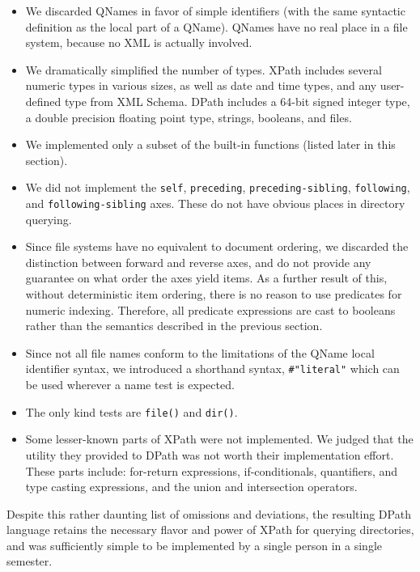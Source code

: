\documentclass{scrartcl}
\begin{document}
\begin{itemize}
\item We discarded QNames in favor of simple identifiers (with the same
  syntactic definition as the local part of a QName). QNames have no real place
  in a file system, because no XML is actually involved.
\item We dramatically simplified the number of types. XPath includes several
  numeric types in various sizes, as well as date and time types, and any
  user-defined type from XML Schema. DPath includes a 64-bit signed integer
  type, a double precision floating point type, strings, booleans, and files.
\item We implemented only a subset of the built-in functions (listed later in
  this section).
\item We did not implement the \texttt{self}, \texttt{preceding},
  \texttt{preceding-sibling}, \texttt{following}, and \texttt{following-sibling}
  axes. These do not have obvious places in directory querying.
\item Since file systems have no equivalent to document ordering, we discarded
  the distinction between forward and reverse axes, and do not provide any
  guarantee on what order the axes yield items. As a further result of this,
  without deterministic item ordering, there is no reason to use predicates for
  numeric indexing. Therefore, all predicate expressions are cast to booleans
  rather than the semantics described in the previous section.
\item Since not all file names conform to the limitations of the QName local
  identifier syntax, we introduced a shorthand syntax, \texttt{\#"literal"}
  which can be used wherever a name test is expected.
\item The only kind tests are \texttt{file()} and \texttt{dir()}.
\item Some lesser-known parts of XPath were not implemented. We judged that the
  utility they provided to DPath was not worth their implementation effort.
  These parts include: for-return expressions, if-conditionals, quantifiers, and
  type casting expressions, and the union and intersection operators.
\end{itemize}

Despite this rather daunting list of omissions and deviations, the resulting
DPath language retains the necessary flavor and power of XPath for querying
directories, and was sufficiently simple to be implemented by a single person in
a single semester.
\end{document}
